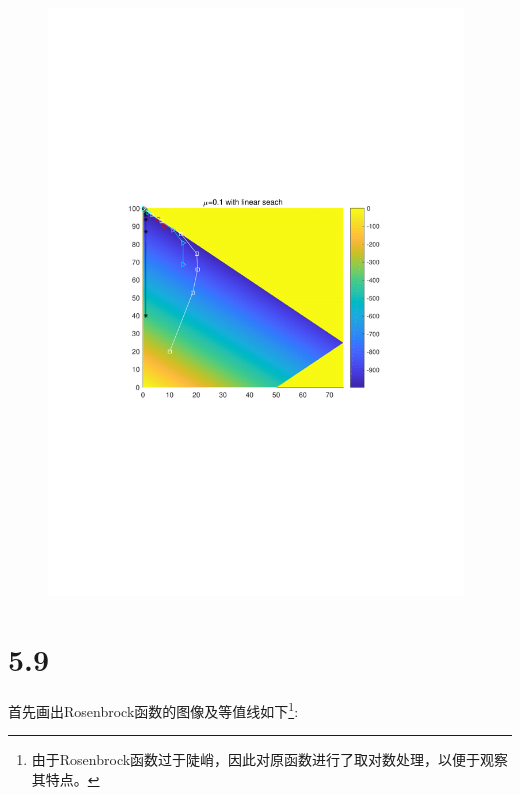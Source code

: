 \begin{figure}[H]
\centering
\includegraphics[width=11cm]{fig/5_2.pdf}
\end{figure}



\section{5.9}
首先画出Rosenbrock函数的图像及等值线如下\footnote{由于Rosenbrock函数过于陡峭，因此对原函数进行了取对数处理，以便于观察其特点。}:


